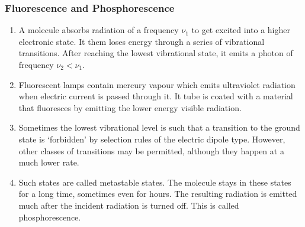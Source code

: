 \documentclass{beamer}
\begin{document}
\begin{frame}
\frametitle{Fluorescence and Phosphorescence}
\begin{enumerate}
\item A molecule absorbs radiation of a frequency $\nu_1$ to get excited into a
higher electronic state. It them loses energy through a series of vibrational
transitions. After reaching the lowest vibrational state, it emits a photon of
frequency $\nu_2 < \nu_1$.
\item Fluorescent lamps contain mercury vapour which emits ultraviolet radiation
when electric current is passed through it. It tube is coated with a material 
that fluoresces by emitting the lower energy visible radiation.
\item Sometimes the lowest vibrational level is such that a transition to the
ground state is `forbidden' by selection rules of the electric dipole type. 
However, other classes of transitions may be permitted, although they happen
at a much lower rate.
\item Such states are called metastable states. The molecule stays in these 
states for a long time, sometimes even for hours. The resulting radiation is
emitted much after the incident radiation is turned off. This is called
phosphorescence.
\end{enumerate}
\end{frame}
\end{document}
